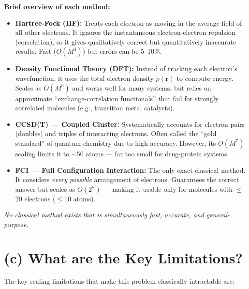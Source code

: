 \documentclass[11pt]{article}
\begin{document}
\textbf{Brief overview of each method:}
\begin{itemize}
    \item \textbf{Hartree-Fock (HF):} Treats each electron as moving in the average field of all other electrons. It ignores the instantaneous electron-electron repulsion (correlation), so it gives qualitatively correct but quantitatively inaccurate results. Fast ($O(M^4)$) but errors can be 5--10\%.
    
    \item \textbf{Density Functional Theory (DFT):} Instead of tracking each electron's wavefunction, it uses the total electron density $\rho(\mathbf{r})$ to compute energy. Scales as $O(M^3)$ and works well for many systems, but relies on approximate ``exchange-correlation functionals'' that fail for strongly correlated molecules (e.g., transition metal catalysts).
    
    \item \textbf{CCSD(T) --- Coupled Cluster:} Systematically accounts for electron pairs (doubles) and triples of interacting electrons. Often called the ``gold standard'' of quantum chemistry due to high accuracy. However, its $O(M^7)$ scaling limits it to $\sim$50 atoms --- far too small for drug-protein systems.
    
    \item \textbf{FCI --- Full Configuration Interaction:} The only exact classical method. It considers \textit{every possible} arrangement of electrons. Guarantees the correct answer but scales as $O(2^n)$ --- making it usable only for molecules with $\leq$20 electrons ($\leq$10 atoms).
\end{itemize}

\textit{No classical method exists that is simultaneously fast, accurate, and general-purpose.}

\section*{(c) What are the Key Limitations?}

The key scaling limitations that make this problem classically intractable are:
\end{document}

